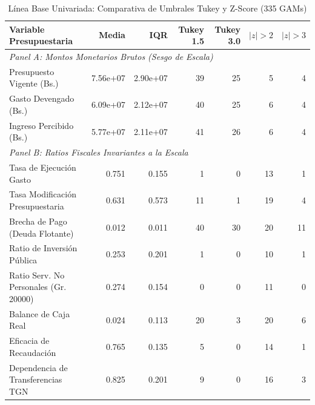 \begin{table}[htbp]
\centering
\footnotesize
\caption{L\'inea Base Univariada: Comparativa de Umbrales Tukey y Z-Score (335 GAMs)}
\label{tab:linea_base_univariada}
\begin{tabular}{lrrrrrr}
\hline
\textbf{Variable Presupuestaria} & \textbf{Media} & \textbf{IQR} & \textbf{Tukey 1.5} & \textbf{Tukey 3.0} & \textbf{$|z|>2$} & \textbf{$|z|>3$} \\
\hline
\multicolumn{7}{l}{\textit{Panel A: Montos Monetarios Brutos (Sesgo de Escala)}} \\
Presupuesto Vigente (Bs.) & 7.56e+07 & 2.90e+07 & 39 & 25 & 5 & 4 \\
Gasto Devengado (Bs.) & 6.09e+07 & 2.12e+07 & 40 & 25 & 6 & 4 \\
Ingreso Percibido (Bs.) & 5.77e+07 & 2.11e+07 & 41 & 26 & 6 & 4 \\
\hline
\multicolumn{7}{l}{\textit{Panel B: Ratios Fiscales Invariantes a la Escala}} \\
Tasa de Ejecución Gasto & 0.751 & 0.155 & 1 & 0 & 13 & 1 \\
Tasa Modificación Presupuestaria & 0.631 & 0.573 & 11 & 1 & 19 & 4 \\
Brecha de Pago (Deuda Flotante) & 0.012 & 0.011 & 40 & 30 & 20 & 11 \\
Ratio de Inversión Pública & 0.253 & 0.201 & 1 & 0 & 10 & 1 \\
Ratio Serv. No Personales (Gr. 20000) & 0.274 & 0.154 & 0 & 0 & 11 & 0 \\
Balance de Caja Real & 0.024 & 0.113 & 20 & 3 & 20 & 6 \\
Eficacia de Recaudación & 0.765 & 0.135 & 5 & 0 & 14 & 1 \\
Dependencia de Transferencias TGN & 0.825 & 0.201 & 9 & 0 & 16 & 3 \\
\hline
\end{tabular}
\end{table}
